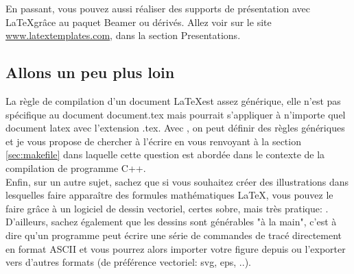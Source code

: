 En passant, vous pouvez aussi réaliser des supports de présentation avec \LaTeX grâce au paquet Beamer ou dérivés. Allez voir sur le site \url{www.latextemplates.com}, dans la section Presentations.


\subsection{Allons un peu plus loin}

La règle de compilation d'un document \LaTeX est assez générique, elle n'est pas spécifique au document document.tex mais pourrait s'appliquer à n'importe quel document latex avec l'extension .tex. Avec \make, on peut définir des règles génériques et je vous propose de chercher à l'écrire en vous renvoyant à la section \ref{sec:makefile} dans laquelle cette question est abordée dans le contexte de la compilation de programme C++. \\

Enfin, sur un autre sujet, sachez que si vous souhaitez créer des illustrations dans lesquelles faire apparaître des formules mathématiques \LaTeX, vous pouvez le faire grâce à un logiciel de dessin vectoriel, certes sobre, mais très pratique: \xfig. D'ailleurs, sachez également que les dessins \xfig sont générables "à la main", c'est à dire qu'un programme peut écrire une série de commandes de tracé directement en format ASCII et vous pourrez alors importer votre figure depuis \xfig ou l'exporter vers d'autres formats (de préférence vectoriel: svg, eps, ..).



